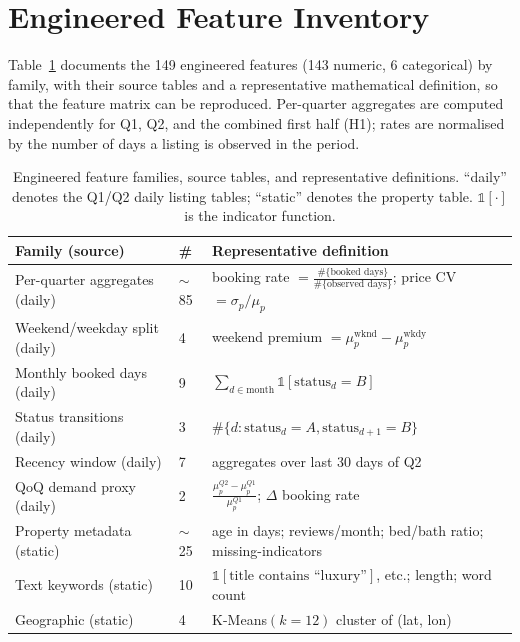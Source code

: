 \documentclass[journal]{IEEEtran}
\begin{document}
\section{Engineered Feature Inventory}
\label{app:features}
Table~\ref{tab:featinventory} documents the 149 engineered features (143 numeric,
6 categorical) by family, with their source tables and a representative
mathematical definition, so that the feature matrix can be reproduced. Per-quarter
aggregates are computed independently for Q1, Q2, and the combined first half
(H1); rates are normalised by the number of days a listing is observed in the
period.

\begin{table}[!t]
\caption{Engineered feature families, source tables, and representative
definitions. ``daily'' denotes the Q1/Q2 daily listing tables; ``static''
denotes the property table. $\mathbb{1}[\cdot]$ is the indicator function.}
\label{tab:featinventory}
\centering
\footnotesize
\begin{tabular}{p{1.05in}p{0.45in}p{1.25in}}
\toprule
Family (source) & \# & Representative definition \\
\midrule
Per-quarter aggregates (daily) & $\sim$85 & booking rate $=\frac{\#\{\text{booked days}\}}{\#\{\text{observed days}\}}$; price CV $=\sigma_{p}/\mu_{p}$ \\
Weekend/weekday split (daily) & 4 & weekend premium $=\mu_{p}^{\text{wknd}}-\mu_{p}^{\text{wkdy}}$ \\
Monthly booked days (daily) & 9 & $\sum_{d\in\text{month}}\mathbb{1}[\text{status}_d=B]$ \\
Status transitions (daily) & 3 & $\#\{d:\text{status}_d{=}A,\text{status}_{d+1}{=}B\}$ \\
Recency window (daily) & 7 & aggregates over last 30 days of Q2 \\
QoQ demand proxy (daily) & 2 & $\frac{\mu_{p}^{Q2}-\mu_{p}^{Q1}}{\mu_{p}^{Q1}}$; $\Delta$ booking rate \\
Property metadata (static) & $\sim$25 & age in days; reviews/month; bed/bath ratio; missing-indicators \\
Text keywords (static) & 10 & $\mathbb{1}[\text{title contains ``luxury''}]$, etc.; length; word count \\
Geographic (static) & 4 & K-Means$(k{=}12)$ cluster of (lat, lon) \\
\bottomrule
\end{tabular}
\end{table}
\end{document}
